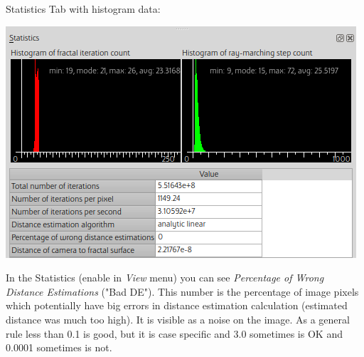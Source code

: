 Statistics Tab with histogram data:
\nopagebreak

\includegraphics[width=0.7\linewidth]{img/manual/media/dock_statistics.png}

In the Statistics (enable in \emph{View} menu) you can see \emph{Percentage of
	Wrong Distance Estimations} ("Bad DE"). This number is the percentage of image
pixels which potentially have big errors in distance estimation calculation
(estimated distance was much too high). It is visible as a noise on the image.
As a general rule less than 0.1 is good, but it is case specific and 3.0
sometimes is OK and 0.0001 sometimes is not.
